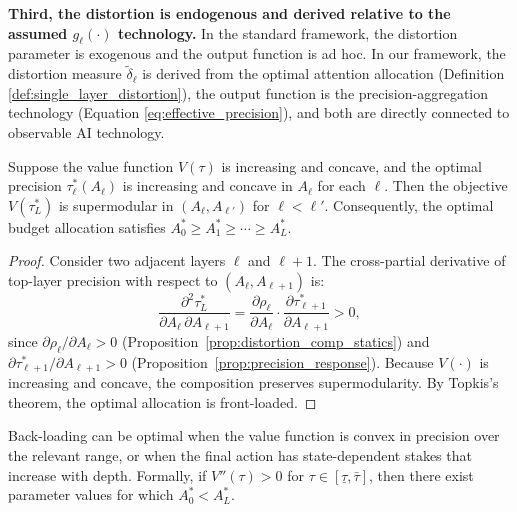\textbf{Third, the distortion is endogenous and derived relative to the assumed $g_\ell(\cdot)$ technology.} In the standard framework, the distortion parameter is exogenous and the output function is ad hoc. In our framework, the distortion measure $\tilde{\delta}_\ell$ is derived from the optimal attention allocation (Definition \ref{def:single_layer_distortion}), the output function is the precision-aggregation technology (Equation \eqref{eq:effective_precision}), and both are directly connected to observable AI technology.

\begin{lemma}\label{lem:front_loading_sufficient}
Suppose the value function $V(\tau)$ is increasing and concave, and the optimal precision $\tau^*_\ell(A_\ell)$ is increasing and concave in $A_\ell$ for each $\ell$. Then the objective $V(\tau^*_L)$ is supermodular in $(A_\ell, A_{\ell'})$ for $\ell < \ell'$. Consequently, the optimal budget allocation satisfies $A^*_0 \geq A^*_1 \geq \cdots \geq A^*_L$.
\end{lemma}

\begin{proof}
Consider two adjacent layers $\ell$ and $\ell+1$. The cross-partial derivative of top-layer precision with respect to $(A_\ell, A_{\ell+1})$ is:
\begin{equation*}
\frac{\partial^2 \tau^*_L}{\partial A_\ell \, \partial A_{\ell+1}} = \frac{\partial \rho_\ell}{\partial A_\ell} \cdot \frac{\partial \tau^*_{\ell+1}}{\partial A_{\ell+1}} > 0,
\end{equation*}
since $\partial \rho_\ell / \partial A_\ell > 0$ (Proposition~\ref{prop:distortion_comp_statics}) and $\partial \tau^*_{\ell+1} / \partial A_{\ell+1} > 0$ (Proposition~\ref{prop:precision_response}). Because $V(\cdot)$ is increasing and concave, the composition preserves supermodularity. By Topkis's theorem, the optimal allocation is front-loaded.
\end{proof}

\begin{corollary}\label{cor:back_loading}
Back-loading can be optimal when the value function is convex in precision over the relevant range, or when the final action has state-dependent stakes that increase with depth. Formally, if $V''(\tau) > 0$ for $\tau \in [\underline{\tau}, \bar{\tau}]$, then there exist parameter values for which $A^*_0 < A^*_L$.
\end{corollary}

